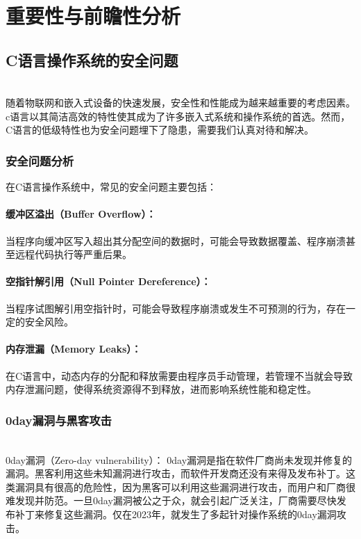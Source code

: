 \section{重要性与前瞻性分析}
\subsection{C语言操作系统的安全问题}\ \\
\indent 随着物联网和嵌入式设备的快速发展，安全性和性能成为越来越重要的考虑因素。c语言以其简洁高效的特性使其成为了许多嵌入式系统和操作系统的首选。然而，C语言的低级特性也为安全问题埋下了隐患，需要我们认真对待和解决。
\subsubsection{安全问题分析}
在C语言操作系统中，常见的安全问题主要包括：
\paragraph{缓冲区溢出（Buffer Overflow）：}
 当程序向缓冲区写入超出其分配空间的数据时，可能会导致数据覆盖、程序崩溃甚至远程代码执行等严重后果。\cite{17}
\paragraph{空指针解引用（Null Pointer Dereference）：}
 当程序试图解引用空指针时，可能会导致程序崩溃或发生不可预测的行为，存在一定的安全风险。\cite{17}
\paragraph{内存泄漏（Memory Leaks）：}
 在C语言中，动态内存的分配和释放需要由程序员手动管理，若管理不当就会导致内存泄漏问题，使得系统资源得不到释放，进而影响系统性能和稳定性。\cite{17}
\subsubsection{0day漏洞与黑客攻击}\ \\
 \indent 0day漏洞（Zero-day vulnerability）： 0day漏洞是指在软件厂商尚未发现并修复的漏洞。黑客利用这些未知漏洞进行攻击，而软件开发商还没有来得及发布补丁。这类漏洞具有很高的危险性，因为黑客可以利用这些漏洞进行攻击，而用户和厂商很难发现并防范。一旦0day漏洞被公之于众，就会引起广泛关注，厂商需要尽快发布补丁来修复这些漏洞。仅在2023年，就发生了多起针对操作系统的0day漏洞攻击。\cite{15}
